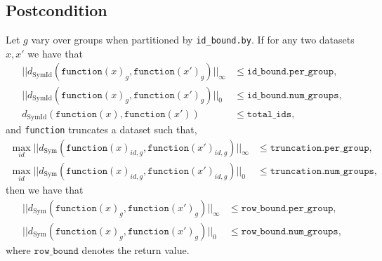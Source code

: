 \documentclass{article}
\begin{document}
\subsection*{Postcondition}
\begin{theorem}[Postcondition]
    Let $g$ vary over groups when partitioned by \texttt{id\_bound.by}.
    If for any two datasets $x, x'$ we have that
    \begin{align*}
        ||d_{\mathrm{SymId}}(\texttt{function}(x)_{g}, \texttt{function}(x')_{g})||_\infty &\le \texttt{id\_bound.per\_group}, \\
        ||d_{\mathrm{SymId}}(\texttt{function}(x)_{g}, \texttt{function}(x')_{g})||_0 &\le \texttt{id\_bound.num\_groups}, \\
        d_{\mathrm{SymId}}(\texttt{function}(x), \texttt{function}(x')) &\le \texttt{total\_ids},
    \end{align*}
    and \texttt{function} truncates a dataset such that, 
    \begin{align*}
        \max_{id} ||d_{\mathrm{Sym}}(\texttt{function}(x)_{id,g}, \texttt{function}(x')_{id,g})||_\infty &\le \texttt{truncation.per\_group}, \\
        \max_{id} ||d_{\mathrm{Sym}}(\texttt{function}(x)_{id,g}, \texttt{function}(x')_{id,g})||_0 &\le \texttt{truncation.num\_groups},
    \end{align*}
    then we have that
    \begin{align*}
        ||d_{\mathrm{Sym}}(\texttt{function}(x)_{g}, \texttt{function}(x')_{g})||_\infty &\le \texttt{row\_bound.per\_group}, \\
        ||d_{\mathrm{Sym}}(\texttt{function}(x)_{g}, \texttt{function}(x')_{g})||_0 &\le \texttt{row\_bound.num\_groups},
    \end{align*}
    where $\texttt{row\_bound}$ denotes the return value.
\end{theorem}
\end{document}
